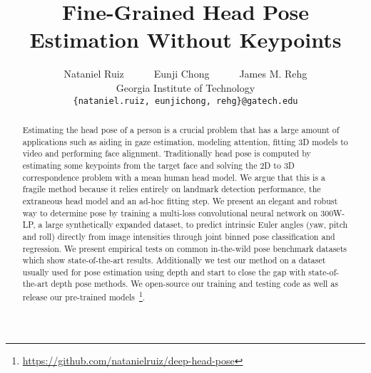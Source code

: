 \documentclass[10pt,twocolumn,letterpaper]{article}
\begin{document}
\title{Fine-Grained Head Pose Estimation Without Keypoints}

\author{Nataniel Ruiz~~~~~~Eunji Chong~~~~~~James M. Rehg\\
Georgia Institute of Technology\\
{\tt\small \{nataniel.ruiz, eunjichong, rehg\}@gatech.edu}
}

\maketitle


\begin{abstract}

Estimating the head pose of a person is a crucial problem that has a large amount of applications such as aiding in gaze estimation, modeling attention, fitting 3D models to video and performing face alignment. Traditionally head pose is computed by estimating some keypoints from the target face and solving the 2D to 3D correspondence problem with a mean human head model. We argue that this is a fragile method because it relies entirely on landmark detection performance, the extraneous head model and an ad-hoc fitting step. We present an elegant and robust way to determine pose by training a multi-loss convolutional neural network on 300W-LP, a large synthetically expanded dataset, to predict intrinsic Euler angles (yaw, pitch and roll) directly from image intensities through joint binned pose classification and regression. We present empirical tests on common in-the-wild pose benchmark datasets which show state-of-the-art results. Additionally we test our method on a dataset usually used for pose estimation using depth and start to close the gap with state-of-the-art depth pose methods. We open-source our training and testing code as well as release our pre-trained models~\footnote{\url{https://github.com/natanielruiz/deep-head-pose}}.

\end{abstract}
\end{document}

